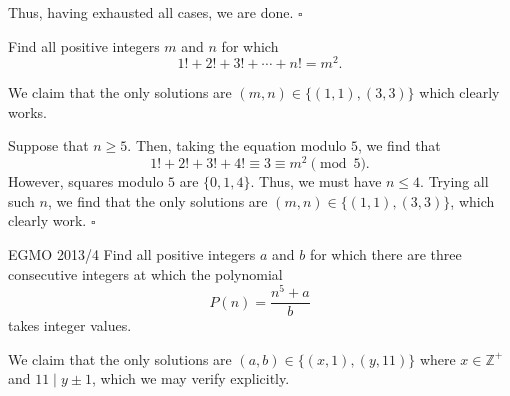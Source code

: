 \documentclass{article}
\begin{document}
Thus, having exhausted all cases, we are done. $\square$

\begin{problem}[4.9.8]{}
Find all positive integers $m$ and $n$ for which \[1! + 2! + 3! + \cdots + n! = m^2.\]
\end{problem}

We claim that the only solutions are $(m, n) \in \{(1, 1), (3, 3)\}$ which clearly works.

Suppose that $n \ge 5$. Then, taking the equation modulo $5$, we find that \[1!+2!+3!+4! \equiv 3 \equiv m^2 \pmod{5}.\] However, squares modulo $5$ are $\{0, 1, 4\}$. Thus, we must have $n \le 4$. Trying all such $n$, we find that the only solutions are $(m, n) \in \{(1, 1), (3, 3)\}$, which clearly work. $\square$

\begin{problem}[4.9.9]{EGMO 2013/4}
Find all positive integers $a$ and $b$ for which there are three consecutive integers at which the polynomial \[P(n) = \dfrac{n^5+a}{b}\] takes integer values.
\end{problem}

We claim that the only solutions are $\boxed{(a, b) \in \{(x, 1), (y, 11)\}}$ where $x \in \mathbb{Z}^+$ and $11 \mid y\pm 1$, which we may verify explicitly.
\end{document}
